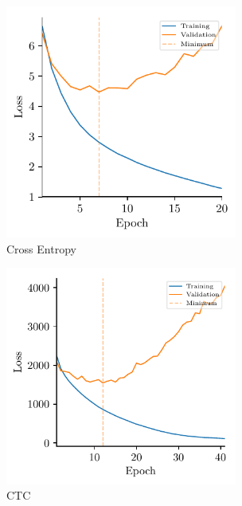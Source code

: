 \begin{figure}[h]
  \begin{subfigure}{3in}
  \centering
    \includegraphics[width=3in]{figures/results/losses/gru-events}
    \caption{Cross Entropy}
  \end{subfigure}
  \hfill
  \begin{subfigure}{3in}
  \centering
    \includegraphics[width=3in]{figures/results/losses/ctc-events}
    \caption{CTC}
  \end{subfigure}
  \caption{}
  \label{fig:loss-events}
\end{figure}

